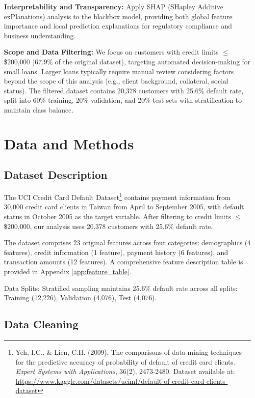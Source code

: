 \documentclass[12pt]{article}
\begin{document}
\textbf{Interpretability and Transparency:} Apply SHAP (SHapley Additive exPlanations) analysis to the blackbox model, providing both global feature importance and local prediction explanations for regulatory compliance and business understanding.

\textbf{Scope and Data Filtering:} We focus on customers with credit limits $\leq$ \$200,000 (67.9\% of the original dataset), targeting automated decision-making for small loans. Larger loans typically require manual review considering factors beyond the scope of this analysis (e.g., client background, collateral, social status). The filtered dataset contains 20,378 customers with 25.6\% default rate, split into 60\% training, 20\% validation, and 20\% test sets with stratification to maintain class balance.

\section{Data and Methods}
\subsection{Dataset Description}

The UCI Credit Card Default Dataset\footnote{Yeh, I.C., \& Lien, C.H. (2009). The comparisons of data mining techniques for the predictive accuracy of probability of default of credit card clients. \textit{Expert Systems with Applications}, 36(2), 2473-2480. Dataset available at: \url{https://www.kaggle.com/datasets/uciml/default-of-credit-card-clients-dataset}} contains payment information from 30,000 credit card clients in Taiwan from April to September 2005, with default status in October 2005 as the target variable. After filtering to credit limits $\leq$ \$200,000, our analysis uses 20,378 customers with 25.6\% default rate.

The dataset comprises 23 original features across four categories: demographics (4 features), credit information (1 feature), payment history (6 features), and transaction amounts (12 features). A comprehensive feature description table is provided in Appendix \ref{app:feature_table}.

Data Splits: Stratified sampling maintains 25.6\% default rate across all splits: Training (12,226), Validation (4,076), Test (4,076).

\subsection{Data Cleaning}
\end{document}
